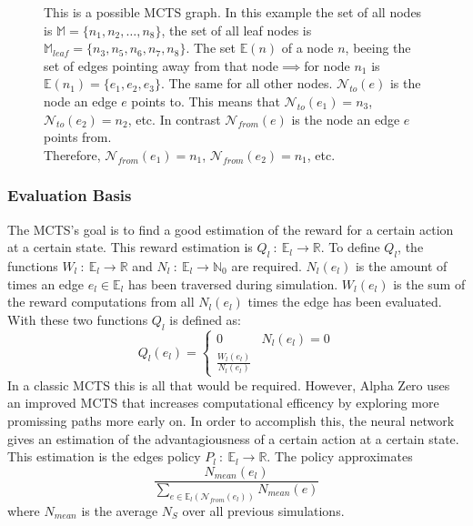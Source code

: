 \documentclass[12pt]{article}
\begin{document}
\begin{figure}[H]
  \centering
  
  \captionsetup{width=.9\linewidth}
  \caption{This is a possible MCTS graph. In this example the set of all nodes is \(\mathbb M = \{n_1, n_2,\hdots,n_8\}\), the set of all leaf nodes is \(\mathbb M_{leaf} =  \{n_3, n_5, n_6, n_7, n_8\}\). The set  \(\mathbb E(n)\) of a node \(n\), beeing the set of edges pointing away from that node\(\implies\)for node \(n_1\) is \(\mathbb E(n_1) = \{e_1, e_2,e_3\}\). The same for all other nodes. \(\mathcal N_{to}(e)\) is the node an edge \(e\) points to. This means that \(\mathcal N_{to}(e_1) = n_3\), \(\mathcal N_{to}(e_2) = n_2\), etc. In contrast \(\mathcal N_{from}(e)\) is the node an edge \(e\) points from.\\
  Therefore, \(\mathcal N_{from}(e_1) = n_1\), \(\mathcal N_{from}(e_2) = n_1\), etc.}
	\label{fig:mcts:example}
\end{figure}

\subsubsection{Evaluation Basis}
The MCTS's goal is to find a good estimation of the reward for a certain action at a certain state. This reward estimation is \(Q_l~:~\mathbb{E}_{l}\to \mathbb{R}\). To define \(Q_l\), the functions \(W_l~:~\mathbb{E}_{l}\to\mathbb{R}\) and \(N_l~:~\mathbb{E}_{l}\to\mathbb{N}_0\) are required. \(N_l(e_l)\) is the amount of times an edge \(e_l\in\mathbb{E}_{l}\) has been traversed during simulation. \(W_l(e_l)\) is the sum of the reward computations from all \(N_l(e_l)\) times the edge has been evaluated. With these two functions \(Q_l\) is defined as:
\begin{equation}\label{eq:Ql}
Q_l(e_l) = 
\begin{cases}
0 & N_l(e_l) = 0\\
\frac{W_l(e_l)}{N_l(e_l)} &
\end{cases}
\end{equation}
In a classic MCTS this is all that would be required. However, Alpha Zero uses an improved MCTS that increases computational efficency by exploring more promissing paths more early on. In order to accomplish this, the neural network gives an estimation of the advantagiousness of a certain action at a certain state. This estimation is the edges policy \(P_l~:~\mathbb E_l \to \mathbb R\). The policy approximates
\begin{equation}
\frac{N_{mean}(e_l)}{\sum_{e\in\mathbb E_l(\mathcal N_{from}(e_l))} N_{mean}(e)}
\end{equation}
where \(N_{mean}\) is the average \(N_S\) over all previous simulations.
\end{document}
